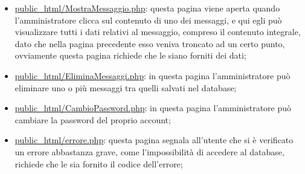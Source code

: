 {\begin{itemize}
		\item \underline{public\_html/MostraMessaggio.php}: questa pagina viene aperta quando l'amministratore clicca sul contenuto di uno dei messaggi, e qui egli può visualizzare tutti i dati relativi al messaggio, compreso il contenuto integrale, dato che nella pagina precedente esso veniva troncato ad un certo punto, ovviamente questa pagina richiede che le siano forniti dei dati;
		\item \href{http://tecnologie-web.studenti.math.unipd.it/tecweb/~pgabelli/public\_html/EliminaMessaggi.php}{public\_html/EliminaMessaggi.php}: in questa pagina l'amministratore può eliminare uno o più messaggi tra quelli salvati nel database;
		\item \href{http://tecnologie-web.studenti.math.unipd.it/tecweb/~pgabelli/public\_html/CambioPassword.php}{public\_html/CambioPassword.php}: in questa pagina l'amministratore può cambiare la password del proprio account;
		\item \underline{public\_html/errore.php}: questa pagina segnala all'utente che si è verificato un errore abbastanza grave, come l'impossibilità di accedere al database, richiede che le sia fornito il codice dell'errore;
	\end{itemize}
}